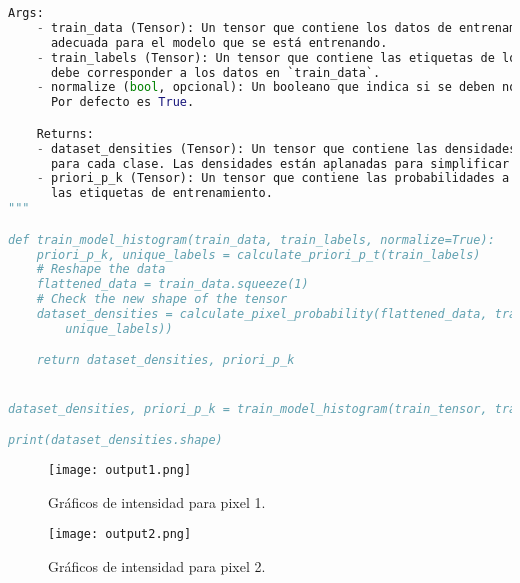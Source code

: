 \documentclass[spanish]{article}
\begin{document}
\begin{enumerate}
\begin{enumerate}
\begin{enumerate}
\begin{enumerate}
\begin{lstlisting}[language=Python, caption=Calculo de dataset densities]
    Args:
    - train_data (Tensor): Un tensor que contiene los datos de entrenamiento. Se espera que tenga la forma
      adecuada para el modelo que se está entrenando.
    - train_labels (Tensor): Un tensor que contiene las etiquetas de los datos de entrenamiento. Cada etiqueta
      debe corresponder a los datos en `train_data`.
    - normalize (bool, opcional): Un booleano que indica si se deben normalizar las densidades de los datos.
      Por defecto es True.

    Returns:
    - dataset_densities (Tensor): Un tensor que contiene las densidades de los datos de entrenamiento
      para cada clase. Las densidades están aplanadas para simplificar su estructura.
    - priori_p_k (Tensor): Un tensor que contiene las probabilidades a priori de cada clase basadas en
      las etiquetas de entrenamiento.
"""

def train_model_histogram(train_data, train_labels, normalize=True):
    priori_p_k, unique_labels = calculate_priori_p_t(train_labels)
    # Reshape the data
    flattened_data = train_data.squeeze(1)
    # Check the new shape of the tensor
    dataset_densities = calculate_pixel_probability(flattened_data, train_labels, num_classes=len(
        unique_labels))

    return dataset_densities, priori_p_k


dataset_densities, priori_p_k = train_model_histogram(train_tensor, train_labels)

print(dataset_densities.shape)
\end{lstlisting}



\begin{figure}[h]
\begin{centering}
\texttt{[image: output1.png]}
\par\end{centering}
\caption{Gráficos de intensidad para pixel 1.\label{fig:Graficos de intensidad para pixel 1}}

\end{figure}


\begin{figure}[h]
\begin{centering}
\texttt{[image: output2.png]}
\par\end{centering}
\caption{Gráficos de intensidad para pixel 2. \label{fig:Graficos de intensidad para pixel 2}}

\end{figure}


\end{enumerate}
\end{enumerate}
\end{enumerate}
\end{enumerate}
\end{document}
